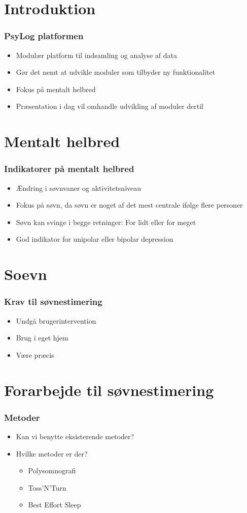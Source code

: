 \section{Introduktion}
\begin{frame}
\frametitle{PsyLog platformen}
	\begin{itemize}
	\item Modulær platform til indsamling og analyse af data
	\item Gør det nemt at udvikle moduler som tilbyder ny funktionalitet
	\item Fokus på mentalt helbred
	\item Præsentation i dag vil omhandle udvikling af moduler dertil
	\end{itemize}
\end{frame}

\section{Mentalt helbred}
\begin{frame}
\frametitle{Indikatorer på mentalt helbred}
	\begin{itemize}
	\item Ændring i søvnvaner og aktivitetsniveau
	\item Fokus på søvn, da søvn er noget af det mest centrale ifølge flere personer
	\item Søvn kan svinge i begge retninger: For lidt eller for meget
	\item God indikator for unipolar eller bipolar depression
	\end{itemize}
\end{frame}

\section{Soevn}
\begin{frame}
\frametitle{Krav til søvnestimering}
	\begin{itemize}
	\item Undgå brugerintervention
	\item Brug i eget hjem
	\item Være præcis
	\end{itemize}
\end{frame}

\section{Forarbejde til søvnestimering}
\begin{frame}
\frametitle{Metoder}
	\begin{itemize}
	\item Kan vi benytte eksisterende metoder?
	\item Hvilke metoder er der?
	{\begin{itemize}
		\item Polysomnografi
		\item Toss'N'Turn
		\item Best Effort Sleep
		 \end{itemize}}
	\end{itemize}
\end{frame}


